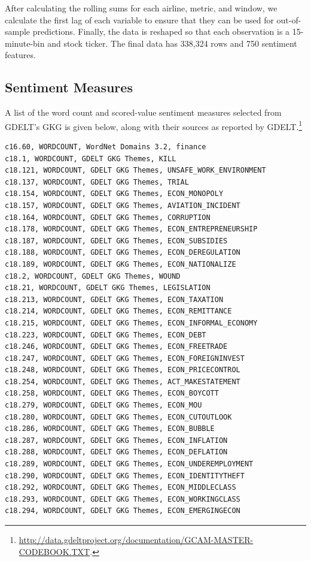 \documentclass[12pt]{article}
\begin{document}
After calculating the rolling sums for each airline, metric, and window, we calculate the first lag of each variable to ensure that they can be used for out-of-sample predictions. Finally, the data is reshaped so that each observation is a 15-minute-bin and stock ticker. The final data has 338,324 rows and 750 sentiment features.

\subsection{Sentiment Measures}
A list of the word count and scored-value sentiment measures selected from GDELT's GKG is given below, along with their sources as reported by GDELT.\footnote{\url{http://data.gdeltproject.org/documentation/GCAM-MASTER-CODEBOOK.TXT}.}

\footnotesize
\begin{verbatim}
c16.60, WORDCOUNT, WordNet Domains 3.2, finance
c18.1, WORDCOUNT, GDELT GKG Themes, KILL
c18.121, WORDCOUNT, GDELT GKG Themes, UNSAFE_WORK_ENVIRONMENT
c18.137, WORDCOUNT, GDELT GKG Themes, TRIAL
c18.154, WORDCOUNT, GDELT GKG Themes, ECON_MONOPOLY
c18.157, WORDCOUNT, GDELT GKG Themes, AVIATION_INCIDENT
c18.164, WORDCOUNT, GDELT GKG Themes, CORRUPTION
c18.178, WORDCOUNT, GDELT GKG Themes, ECON_ENTREPRENEURSHIP
c18.187, WORDCOUNT, GDELT GKG Themes, ECON_SUBSIDIES
c18.188, WORDCOUNT, GDELT GKG Themes, ECON_DEREGULATION
c18.189, WORDCOUNT, GDELT GKG Themes, ECON_NATIONALIZE
c18.2, WORDCOUNT, GDELT GKG Themes, WOUND
c18.21, WORDCOUNT, GDELT GKG Themes, LEGISLATION
c18.213, WORDCOUNT, GDELT GKG Themes, ECON_TAXATION
c18.214, WORDCOUNT, GDELT GKG Themes, ECON_REMITTANCE
c18.215, WORDCOUNT, GDELT GKG Themes, ECON_INFORMAL_ECONOMY
c18.223, WORDCOUNT, GDELT GKG Themes, ECON_DEBT
c18.246, WORDCOUNT, GDELT GKG Themes, ECON_FREETRADE
c18.247, WORDCOUNT, GDELT GKG Themes, ECON_FOREIGNINVEST
c18.248, WORDCOUNT, GDELT GKG Themes, ECON_PRICECONTROL
c18.254, WORDCOUNT, GDELT GKG Themes, ACT_MAKESTATEMENT
c18.258, WORDCOUNT, GDELT GKG Themes, ECON_BOYCOTT
c18.279, WORDCOUNT, GDELT GKG Themes, ECON_MOU
c18.280, WORDCOUNT, GDELT GKG Themes, ECON_CUTOUTLOOK
c18.286, WORDCOUNT, GDELT GKG Themes, ECON_BUBBLE
c18.287, WORDCOUNT, GDELT GKG Themes, ECON_INFLATION
c18.288, WORDCOUNT, GDELT GKG Themes, ECON_DEFLATION
c18.289, WORDCOUNT, GDELT GKG Themes, ECON_UNDEREMPLOYMENT
c18.290, WORDCOUNT, GDELT GKG Themes, ECON_IDENTITYTHEFT
c18.292, WORDCOUNT, GDELT GKG Themes, ECON_MIDDLECLASS
c18.293, WORDCOUNT, GDELT GKG Themes, ECON_WORKINGCLASS
c18.294, WORDCOUNT, GDELT GKG Themes, ECON_EMERGINGECON

\end{verbatim}
\end{document}
